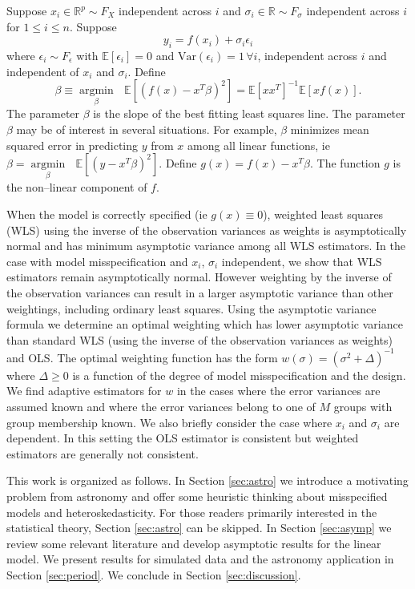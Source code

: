\documentclass[ejs,ps,preprint]{imsart}
\numberwithin{equation}{section}
\theoremstyle{plain}
\newcommand{\Var}{\text{Var}}
\newcommand{\E}{\mathbb{E}}
\newcommand{\argmin}[1]{\underset{#1}{\operatorname{argmin}}\text{ }}
\def\E{\mathbb{E}}
\begin{document}
Suppose $x_i \in \mathbb{R}^p \sim F_X$ independent across $i$ and $\sigma_i \in \mathbb{R} \sim F_\sigma$ independent across $i$ for $1 \leq i \leq n$. Suppose
\begin{equation*}
y_i = f(x_i) + \sigma_i \epsilon_i
\end{equation*}
where $\epsilon_i \sim F_\epsilon$ with $\E[\epsilon_i] = 0$ and $\Var(\epsilon_i) = 1 \, \forall i$, independent across $i$ and independent of $x_i$ and $\sigma_i$. Define 
\begin{equation*}
\beta \equiv \argmin{\beta} \E[(f(x) - x^T\beta)^2] = \E[xx^T]^{-1}\E[xf(x)].
\end{equation*}
The parameter $\beta$ is the slope of the best fitting least squares line. The parameter $\beta$ may be of interest in several situations. For example, $\beta$ minimizes mean squared error in predicting $y$ from $x$ among all linear functions, ie $\beta = \argmin{\beta} \E[(y - x^T\beta)^2]$. Define $g(x) = f(x) - x^T\beta$. The function $g$ is the non--linear component of $f$.

When the model is correctly specified (ie $g(x) \equiv 0$), weighted least squares (WLS) using the inverse of the observation variances as weights is asymptotically normal and has minimum asymptotic variance among all WLS estimators. In the case with model misspecification and $x_i$, $\sigma_i$ independent, we show that WLS estimators remain asymptotically normal. However weighting by the inverse of the observation variances can result in a larger asymptotic variance than other weightings, including ordinary least squares. Using the asymptotic variance formula we determine an optimal weighting which has lower asymptotic variance than standard WLS (using the inverse of the observation variances as weights) and OLS. The optimal weighting function has the form $w(\sigma) = (\sigma^2 + \Delta)^{-1}$ where $\Delta \geq 0$ is a function of the degree of model misspecification and the design. We find adaptive estimators for $w$ in the cases where the error variances are assumed known and where the error variances belong to one of $M$ groups with group membership known. We also briefly consider the case where $x_i$ and $\sigma_i$ are dependent. In this setting the OLS estimator is consistent but weighted estimators are generally not consistent.

This work is organized as follows. In Section \ref{sec:astro} we introduce a motivating problem from astronomy and offer some heuristic thinking about misspecified models and heteroskedasticity. For those readers primarily interested in the statistical theory, Section \ref{sec:astro} can be skipped. In Section \ref{sec:asymp} we review some relevant literature and develop asymptotic results for the linear model.  We present results for simulated data and the astronomy application in Section \ref{sec:period}. We conclude in Section \ref{sec:discussion}.
\end{document}
